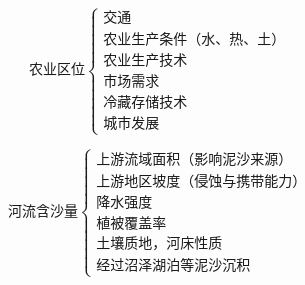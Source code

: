 \documentclass[UTF8]{ctexart}
\begin{document}
\par

\begin{multicols}{2}
    
    \[
        \textbf{农业区位}
        \begin{cases}
            \text{交通}\\
            \text{农业生产条件（水、热、土）}\\
            \text{农业生产技术}\\
            \text{市场需求}\\
            \text{冷藏存储技术}\\
            \text{城市发展}
        \end{cases}
    \]

    \[
        \textbf{河流含沙量}
        \begin{cases}
            \text{上游流域面积（影响泥沙来源）}\\
            \text{上游地区坡度（侵蚀与携带能力）}\\
            \text{降水强度}\\
            \text{植被覆盖率}\\
            \text{土壤质地，河床性质}\\
            \text{经过沼泽湖泊等泥沙沉积}
        \end{cases}
    \]

\end{multicols}

\par
\end{document}
